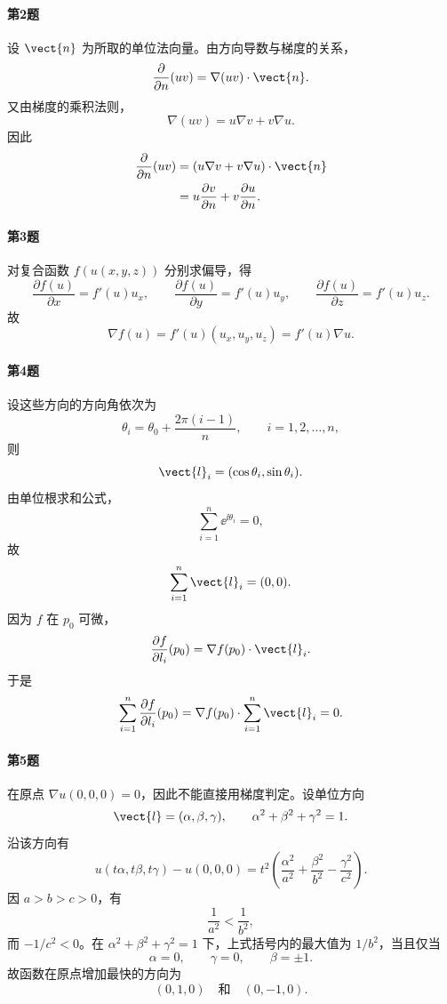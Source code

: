 \paragraph{第2题}
\begin{xsolution}
设 $\vect{n}$ 为所取的单位法向量。由方向导数与梯度的关系，
\[
  \frac{\partial}{\partial n}(uv)
  =\nabla(uv)\cdot\vect{n}.
\]
又由梯度的乘积法则，
\[
  \nabla(uv)=u\nabla v+v\nabla u.
\]
因此
\[
\begin{aligned}
  \frac{\partial}{\partial n}(uv)
  &=(u\nabla v+v\nabla u)\cdot\vect{n}\\
  &=u\frac{\partial v}{\partial n}
  +v\frac{\partial u}{\partial n}.
\end{aligned}
\]
\end{xsolution}

\paragraph{第3题}
\begin{xsolution}
对复合函数 $f(u(x,y,z))$ 分别求偏导，得
\[
  \frac{\partial f(u)}{\partial x}=f'(u)u_x,
  \qquad
  \frac{\partial f(u)}{\partial y}=f'(u)u_y,
  \qquad
  \frac{\partial f(u)}{\partial z}=f'(u)u_z.
\]
故
\[
  \nabla f(u)
  =f'(u)(u_x,u_y,u_z)
  =f'(u)\nabla u.
\]
\end{xsolution}

\paragraph{第4题}
\begin{xsolution}
设这些方向的方向角依次为
\[
  \theta_i=\theta_0+\frac{2\pi(i-1)}n,
  \qquad i=1,2,\ldots,n,
\]
则
\[
  \vect{l}_i=(\cos\theta_i,\sin\theta_i).
\]
由单位根求和公式，
\[
  \sum_{i=1}^n\ee^{\ii\theta_i}=0,
\]
故
\[
  \sum_{i=1}^n\vect{l}_i=(0,0).
\]
因为 $f$ 在 $p_0$ 可微，
\[
  \frac{\partial f}{\partial l_i}(p_0)
  =\nabla f(p_0)\cdot\vect{l}_i.
\]
于是
\[
  \sum_{i=1}^n\frac{\partial f}{\partial l_i}(p_0)
  =\nabla f(p_0)\cdot\sum_{i=1}^n\vect{l}_i=0.
\]
\end{xsolution}

\paragraph{第5题}
\begin{xsolution}
在原点 $\nabla u(0,0,0)=0$，因此不能直接用梯度判定。设单位方向
\[
  \vect{l}=(\alpha,\beta,\gamma),
  \qquad
  \alpha^2+\beta^2+\gamma^2=1.
\]
沿该方向有
\[
  u(t\alpha,t\beta,t\gamma)-u(0,0,0)
  =t^2\left(
  \frac{\alpha^2}{a^2}+\frac{\beta^2}{b^2}-\frac{\gamma^2}{c^2}
  \right).
\]
因 $a>b>c>0$，有
\[
  \frac1{a^2}<\frac1{b^2},
\]
而 $-1/c^2<0$。在 $\alpha^2+\beta^2+\gamma^2=1$ 下，上式括号内的最大值为 $1/b^2$，当且仅当
\[
  \alpha=0,\qquad \gamma=0,\qquad \beta=\pm1.
\]
故函数在原点增加最快的方向为
\[
  (0,1,0)\quad\text{和}\quad(0,-1,0).
\]
\end{xsolution}

